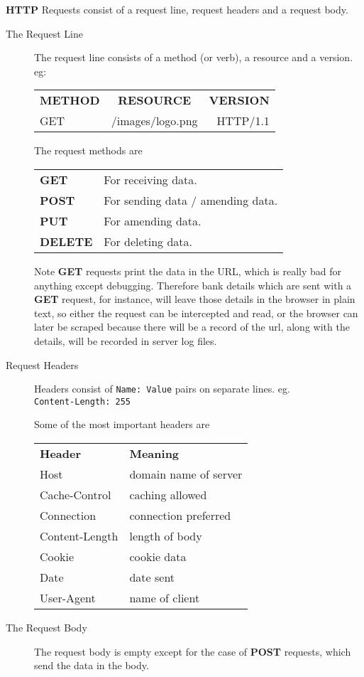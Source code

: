 \documentclass[11pt]{article}
\begin{document}
\textbf{HTTP} Requests consist of a request line, request headers and a request body.
\begin{description}
\item[The Request Line]
The request line consists of a method (or verb), a resource and a version.
eg:

\begin{tabular}{ l c r }
  \textbf{METHOD} & \textbf{RESOURCE} & \textbf{VERSION} \\
  GET & /images/logo.png & HTTP/1.1 \\
\end{tabular}

The request methods are

\begin{tabular}{ l l }
  \textbf{GET} & For receiving data. \\
  \textbf{POST} & For sending data / amending data. \\
  \textbf{PUT} & For amending data. \\
  \textbf{DELETE} & For deleting data. \\
\end{tabular}

Note \textbf{GET} requests print the data in the URL, which is really bad for anything except debugging. Therefore bank details which are sent with a \textbf{GET} request, for instance, will leave those details in the browser in plain text, so either the request can be intercepted and read, or the browser can later be scraped because there will be a record of the url, along with the details, will be recorded in server log files.
\item[Request Headers]
Headers consist of \texttt{Name: Value} pairs on separate lines.
eg. \\
\texttt{Content-Length: 255}
 
Some of the most important headers are \\
\begin{tabular}{ l l }
  \textbf{Header} & \textbf{Meaning} \\

  Host & domain name of server \\

  Cache-Control & caching allowed \\

  Connection & connection preferred \\

  Content-Length & length of body \\

  Cookie & cookie data \\

  Date & date sent \\

  User-Agent &  name of client \\
\end{tabular}
\item[The Request Body]
The request body is empty except for the case of \textbf{POST} requests, which send the data in the body.
\end{description}
\end{document}
